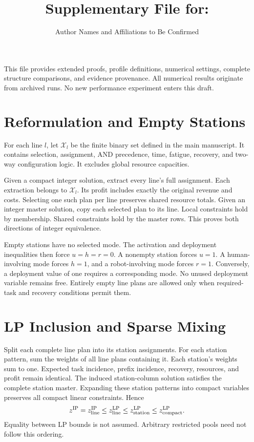 \documentclass[letterpaper,journal]{IEEEtran}
\begin{document}
\title{Supplementary File for:\\ \drafttitle}
\author{Author Names and Affiliations to Be Confirmed}
\maketitle
This file provides extended proofs, profile definitions, numerical settings, complete structure comparisons, and evidence provenance. All numerical results originate from archived runs. No new performance experiment enters this draft.

\section{Reformulation and Empty Stations}
For each line $l$, let $\mathcal X_l$ be the finite binary set defined in the main manuscript. It contains selection, assignment, AND precedence, time, fatigue, recovery, and two-way configuration logic. It excludes global resource capacities.

Given a compact integer solution, extract every line's full assignment. Each extraction belongs to $\mathcal X_l$. Its profit includes exactly the original revenue and costs. Selecting one such plan per line preserves shared resource totals. Given an integer master solution, copy each selected plan to its line. Local constraints hold by membership. Shared constraints hold by the master rows. This proves both directions of integer equivalence.

Empty stations have no selected mode. The activation and deployment inequalities then force $u=h=r=0$. A nonempty station forces $u=1$. A human-involving mode forces $h=1$, and a robot-involving mode forces $r=1$. Conversely, a deployment value of one requires a corresponding mode. No unused deployment variable remains free. Entirely empty line plans are allowed only when required-task and recovery conditions permit them.

\section{LP Inclusion and Sparse Mixing}
Split each complete line plan into its station assignments. For each station pattern, sum the weights of all line plans containing it. Each station's weights sum to one. Expected task incidence, prefix incidence, recovery, resources, and profit remain identical. The induced station-column solution satisfies the complete station master. Expanding these station patterns into compact variables preserves all compact linear constraints. Hence
\begin{equation}
z^{\mathrm{IP}}=z_{\rm line}^{\mathrm{IP}}\leq z_{\rm line}^{\mathrm{LP}}
\leq z_{\rm station}^{\mathrm{LP}}\leq z_{\rm compact}^{\mathrm{LP}}.
\end{equation}
Equality between LP bounds is not assumed. Arbitrary restricted pools need not follow this ordering.
\end{document}
